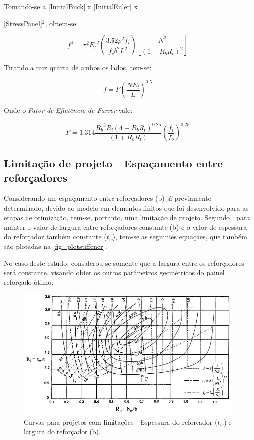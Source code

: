 Tomando-se a \autoref{InitialBuck} x \autoref{InitialEuler} x {\autoref{StressPanel}$^2$, obtem-se:

\begin{equation} \label{StressPanel2}
f^4 = \pi^2{E_t}^2(\frac{3.62{\rho}^2f_i}{f_ob^2L^2})[\dfrac{N^2}{(1+R_bR_t)^2}]
\end{equation}

Tirando a raiz quarta de ambos os lados, tem-se:

\begin{equation} \label{StressPanel3}
f = F(\dfrac{NE_t}{L})^{0.5}
\end{equation}

Onde o \emph{Fator de Eficiência de Farrar} vale:

\begin{equation} \label{Farrar_Efficiency}
F = 1.314{\dfrac{{R_b}^3R_t(4+R_bR_t)^{0.25}}{(1+R_bR_t)}}({\frac{f_i}{f_o}})^{0.25}
\end{equation}

\subsection{Limitação de projeto - Espaçamento entre reforçadores}
Considerando um espaçamento entre reforçadores (b) já previamente determinado, devido ao modelo em elementos finitos que foi desenvolvido para as etapas de otimização, tem-se, portanto, uma limitação de projeto. Segundo \cite{niu1997airframe}, para manter o valor de largura entre reforçadores constante (b) e o valor de espessura do reforçador também constante ($t_w$), tem-se as seguintes equações, que também são plotadas na \autoref{fig_plotstiffener}.

No caso deste estudo, considerou-se somente que a largura entre os reforçadores será constante, visando obter os outros parâmetros geométricos do painel reforçado ótimo.

\begin{figure}[ht]
	\caption{\label{fig_plotstiffener}Curvas para projetos com limitações - Espessura do reforçador ($t_w$) e largura do reforçador (b).}
  \centering
  \includegraphics[scale=1.0]{figura/PlotStiffener}
\end{figure}
\

}
